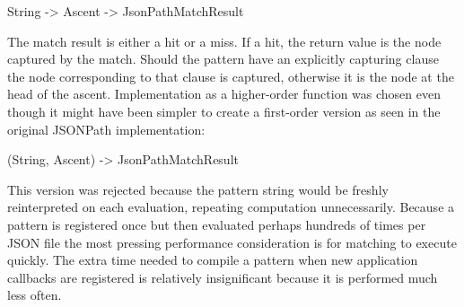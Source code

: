\documentclass[12pt, ]{article}
\newenvironment{Shaded}{}{}
\newcommand{\DataTypeTok}[1]{\textcolor[rgb]{0.56,0.13,0.00}{{#1}}}
\newcommand{\OtherTok}[1]{\textcolor[rgb]{0.00,0.44,0.13}{{#1}}}
\newcommand{\NormalTok}[1]{{#1}}
\begin{document}
\begin{Shaded}
\begin{Highlighting}[]
\DataTypeTok{String} \OtherTok{->} \DataTypeTok{Ascent} \OtherTok{->} \DataTypeTok{JsonPathMatchResult}
\end{Highlighting}
\end{Shaded}

The match result is either a hit or a miss. If a hit, the return value
is the node captured by the match. Should the pattern have an explicitly
capturing clause the node corresponding to that clause is captured,
otherwise it is the node at the head of the ascent. Implementation as a
higher-order function was chosen even though it might have been simpler
to create a first-order version as seen in the original JSONPath
implementation:

\begin{Shaded}
\begin{Highlighting}[]
\NormalTok{(}\DataTypeTok{String}\NormalTok{, }\DataTypeTok{Ascent}\NormalTok{) }\OtherTok{->} \DataTypeTok{JsonPathMatchResult}
\end{Highlighting}
\end{Shaded}

This version was rejected because the pattern string would be freshly
reinterpreted on each evaluation, repeating computation unnecessarily.
Because a pattern is registered once but then evaluated perhaps hundreds
of times per JSON file the most pressing performance consideration is
for matching to execute quickly. The extra time needed to compile a
pattern when new application callbacks are registered is relatively
insignificant because it is performed much less often.
\end{document}
